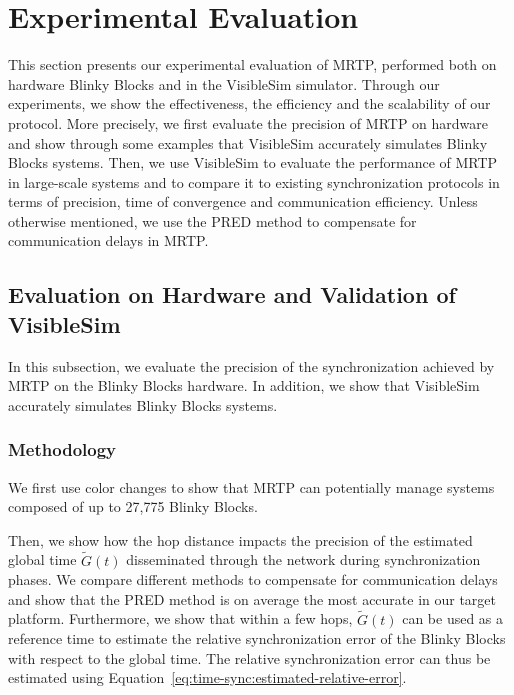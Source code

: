 \section{Experimental Evaluation}
\label{section:time-sync:evaluation}

This section presents our experimental evaluation of MRTP, performed both on hardware Blinky Blocks and in the VisibleSim simulator. Through our experiments, we show the effectiveness, the efficiency and the scalability of our protocol. More precisely, we first evaluate the precision of MRTP on hardware and show through some examples that VisibleSim accurately simulates Blinky Blocks systems. Then, we use VisibleSim to evaluate the performance of MRTP in large-scale systems and to compare it to existing synchronization protocols in terms of precision, time of convergence and communication efficiency. Unless otherwise mentioned, we use the PRED method to compensate for communication delays in MRTP.

\subsection{Evaluation on Hardware and Validation of VisibleSim}
\label{section:time-sync:hardware-eval}

In this subsection, we evaluate the precision of the synchronization achieved by MRTP on the Blinky Blocks hardware. In addition, we show that VisibleSim accurately simulates Blinky Blocks systems. 

\subsubsection{Methodology}

We first use color changes to show that MRTP can potentially manage systems composed of up to 27,775 Blinky Blocks. 

Then, we show how the hop distance impacts the precision of the estimated global time $\tilde{G}(t)$ disseminated through the network during synchronization phases. We compare different methods to compensate for communication delays and show that the PRED method is on average the most accurate in our target platform. Furthermore, we show that within a few hops, $\tilde{G}(t)$ can be used as a reference time to estimate the relative synchronization error of the Blinky Blocks with respect to the global time. The relative synchronization error can thus be estimated using Equation~\eqref{eq:time-sync:estimated-relative-error}. 

